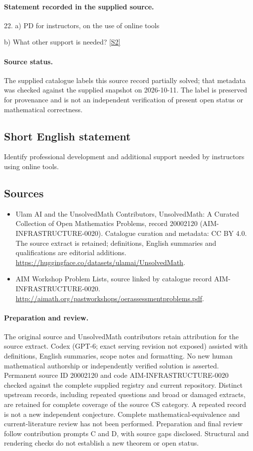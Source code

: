\documentclass[11pt]{article}
\newcommand{\sref}[2]{\hyperlink{source:#1:#2}{[S#2]}}
\begin{document}
\paragraph{Statement recorded in the supplied source.}
22. a) PD for instructors, on the use of online tools

b) What other support is needed? \sref{20002120}{2}
\paragraph{Source status.}
The supplied catalogue labels this source record partially solved; that metadata was checked against the supplied snapshot on 2026-10-11. The label is preserved for provenance and is not an independent verification of present open status or mathematical correctness.
\subsection{Short English statement}
Identify professional development and additional support needed by instructors using online tools.
\subsection{Sources}
\begin{itemize}
\item[\hypertarget{source:20002120:1}{S1}] Ulam AI and the UnsolvedMath Contributors, UnsolvedMath: A Curated Collection of Open Mathematics Problems, record 20002120 (AIM-INFRASTRUCTURE-0020). Catalogue curation and metadata: CC BY 4.0. The source extract is retained; definitions, English summaries and qualifications are editorial additions.
\url{https://huggingface.co/datasets/ulamai/UnsolvedMath}.
\item[\hypertarget{source:20002120:2}{S2}] AIM Workshop Problem Lists, source linked by catalogue record AIM-INFRASTRUCTURE-0020.
\url{http://aimath.org/pastworkshops/oerassessmentproblems.pdf}.
\end{itemize}
\paragraph{Preparation and review.}
The original source and UnsolvedMath contributors retain attribution for the source extract. Codex (GPT-6; exact serving revision not exposed) assisted with definitions, English summaries, scope notes and formatting. No new human mathematical authorship or independently verified solution is asserted. Permanent source ID 20002120 and code AIM-INFRASTRUCTURE-0020 checked against the complete supplied registry and current repository. Distinct upstream records, including repeated questions and broad or damaged extracts, are retained for complete coverage of the source CS category. A repeated record is not a new independent conjecture. Complete mathematical-equivalence and current-literature review has not been performed. Preparation and final review follow contribution prompts C and D, with source gaps disclosed. Structural and rendering checks do not establish a new theorem or open status.
\label{end:20002120}
\end{document}
